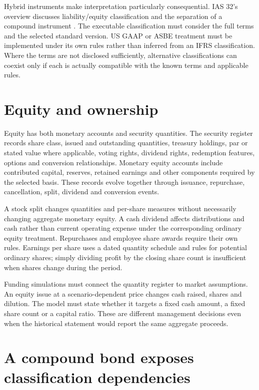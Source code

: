 Hybrid instruments make interpretation particularly consequential. IAS 32's
overview discusses liability/equity classification and the separation of a
compound instrument \citep{ias32}. The executable classification must consider
the full terms and the selected standard version. US GAAP or ASBE treatment
must be implemented under its own rules rather than inferred from an IFRS
classification. Where the terms are not disclosed sufficiently, alternative
classifications can coexist only if each is actually compatible with the
known terms and applicable rules.

\section{Equity and ownership}

Equity has both monetary accounts and security quantities. The security
register records share class, issued and outstanding quantities, treasury
holdings, par or stated value where applicable, voting rights, dividend rights,
redemption features, options and conversion relationships. Monetary equity
accounts include contributed capital, reserves, retained earnings and other
components required by the selected basis. These records evolve together
through issuance, repurchase, cancellation, split, dividend and conversion
events.

A stock split changes quantities and per-share measures without necessarily
changing aggregate monetary equity. A cash dividend affects distributions and
cash rather than current operating expense under the corresponding ordinary
equity treatment. Repurchases and employee share awards require their own
rules. Earnings per share uses a dated quantity schedule and rules for potential
ordinary shares; simply dividing profit by the closing share count is
insufficient when shares change during the period.

Funding simulations must connect the quantity register to market assumptions.
An equity issue at a scenario-dependent price changes cash raised, shares and
dilution. The model must state whether it targets a fixed cash amount, a fixed
share count or a capital ratio. These are different management decisions even
when the historical statement would report the same aggregate proceeds.

\section{A compound bond exposes classification dependencies}

